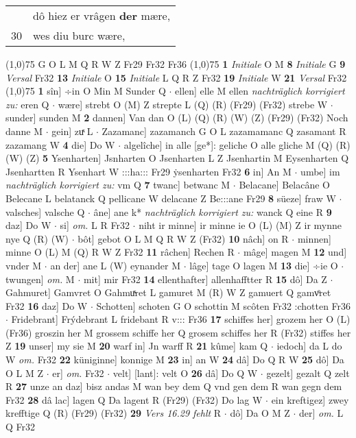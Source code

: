 \documentclass[8pt,a4paper,notitlepage]{article}
\begin{document}
\begin{table}[ht]
\begin{minipage}[t]{0.5\linewidth}
\begin{tabular}{rl}
 & dô hiez er vrâgen \textbf{der} mære,\\ 
30 & wes diu burc wære,\\ 
\end{tabular}
\scriptsize
\line(1,0){75} \newline
G O L M Q R W Z Fr29 Fr32 Fr36 \newline
\line(1,0){75} \newline
\textbf{1} \textit{Initiale} O M  \textbf{8} \textit{Initiale} G  \textbf{9} \textit{Versal} Fr32  \textbf{13} \textit{Initiale} O  \textbf{15} \textit{Initiale} L Q R Z Fr32  \textbf{19} \textit{Initiale} W  \textbf{21} \textit{Versal} Fr32  \newline
\line(1,0){75} \newline
\textbf{1} sîn] ÷in O Min M Sunder Q  $\cdot$ ellen] elle M ellen \textit{nachträglich korrigiert zu:} eren Q  $\cdot$ wære] strebt O (M) Z strepte L (Q) (R) (Fr29) (Fr32) strebe W  $\cdot$ sunder] sunden M \textbf{2} dannen] Van dan O (L) (Q) (R) (W) (Z) (Fr29) (Fr32) Noch danne M  $\cdot$ gein] zuͯ L  $\cdot$ Zazamanc] zazamanch G O L zazamamanc Q zasamant R zazamang W \textbf{4} die] Do W  $\cdot$ algelîche] in alle [ge*]: geliche O alle gliche M (Q) (R) (W) (Z) \textbf{5} Ysenharten] Jsnharten O Jsenharten L Z Jsenhartin M Eysenharten Q Jsenhartten R Ysenhart W :::ha::: Fr29 ẏsenharten Fr32 \textbf{6} in] An M  $\cdot$ umbe] im \textit{nachträglich korrigiert zu:} vm Q \textbf{7} twanc] betwanc M  $\cdot$ Belacane] Belacâne O Belecane L belatanck Q pellicane W delacane Z Be:::ane Fr29 \textbf{8} süeze] fraw W  $\cdot$ valsches] valsche Q  $\cdot$ âne] ane k* \textit{nachträglich korrigiert zu:} wanck Q eine R \textbf{9} daz] Do W  $\cdot$ si] \textit{om.} L R Fr32  $\cdot$ niht ir minne] ir minne ie O (L) (M) Z ir mynne nye Q (R) (W)  $\cdot$ bôt] gebot O L M Q R W Z (Fr32) \textbf{10} nâch] on R  $\cdot$ minnen] minne O (L) M (Q) R W Z Fr32 \textbf{11} râchen] Rechen R  $\cdot$ mâge] magen M \textbf{12} und] vnder M  $\cdot$ an der] ane L (W) eynander M  $\cdot$ lâge] tage O lagen M \textbf{13} die] ÷ie O  $\cdot$ twungen] \textit{om.} M  $\cdot$ mit] mir Fr32 \textbf{14} ellenthafter] allenhafftter R \textbf{15} dô] Da Z  $\cdot$ Gahmuret] Gamvret O Gahmuͯret L gamuret M (R) W Z gamuert Q gamvͦret Fr32 \textbf{16} daz] Do W  $\cdot$ Schotten] schoten G O schottin M scôten Fr32 :chotten Fr36  $\cdot$ Fridebrant] Frýdebrant L fridebant R v::: Fr36 \textbf{17} schiffes her] grozem her O (L) (Fr36) groszin her M grossem schiffe her Q grosem schiffes her R (Fr32) stiffes her Z \textbf{19} unser] my sie M \textbf{20} warf in] Jn warff R \textbf{21} kûme] kam Q  $\cdot$ iedoch] da L do W \textit{om.} Fr32 \textbf{22} küniginne] konnige M \textbf{23} in] an W \textbf{24} dâ] Do Q R W \textbf{25} dô] Da O L M Z  $\cdot$ er] \textit{om.} Fr32  $\cdot$ velt] [lant]: velt O \textbf{26} dâ] Do Q W  $\cdot$ gezelt] gezalt Q zelt R \textbf{27} unze an daz] bisz andas M wan bey dem Q vnd gen dem R wan gegn dem Fr32 \textbf{28} dâ lac] lagen Q Da lagent R (Fr29) (Fr32) Do lag W  $\cdot$ ein kreftigez] zwey krefftige Q (R) (Fr29) (Fr32) \textbf{29} \textit{Vers 16.29 fehlt} R   $\cdot$ dô] Da O M Z  $\cdot$ der] \textit{om.} L Q Fr32 \newline

\end{minipage}
\end{table}
\end{document}
